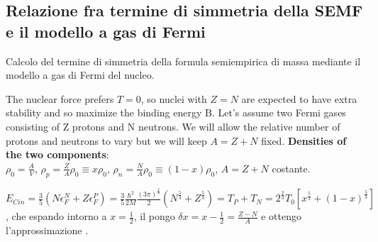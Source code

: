 \subsection{Relazione fra termine di simmetria della SEMF e il modello a gas di Fermi}
Calcolo del termine di simmetria della formula semiempirica di massa mediante il modello a gas di Fermi del nucleo.


The nuclear force prefers $T = 0$, so nuclei with $Z = N$ are expected to have extra stability and so maximize the binding energy B. Let’s assume two Fermi gases consisting of Z protons and N neutrons. We will allow the relative number of protons and neutrons to vary but we will keep $A = Z + N$ fixed.
\textbf{Densities of the two components}:\\
$\rho_0=\frac{A}{V}$, $\rho_p=\frac{Z}{A}\rho_0\equiv x\rho_0$, $\rho_n=\frac{N}{A}\rho_0\equiv (1-x)\rho_0$, $A=Z+N$ costante.

$E_{Cin}=\frac{3}{5}(N\epsilon_F^N+Z\epsilon_F^P)=\frac{3}{5}\frac{\hbar^2}{2M}\frac{(3\pi)^\frac{2}{3}}{2}(N^{\frac{5}{3}}+Z^{\frac{5}{3}})=T_P+T_N=2^\frac{2}{3}T_0[x^\frac{5}{3}+(1-x)^\frac{5}{3}]$, che espando intorno a $x=\frac{1}{2}$, il pongo $\delta x=x-\frac{1}{2}=\frac{Z-N}{A}$ e ottengo l'approssimazione  .


